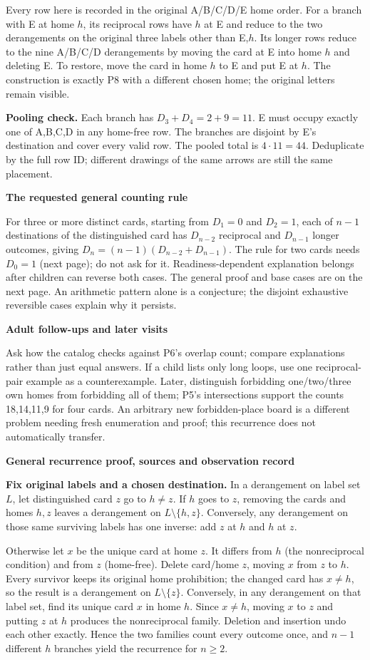 \documentclass[11pt]{article}
\newcommand{\heading}[1]{\par\textbf{\large #1}\par}
\newcommand{\subhead}[1]{\par\textbf{#1}\par}
\newcommand{\guidepage}{\newpage}
\begin{document}
Every row here is recorded in the original A/B/C/D/E home order. For a branch with E at home $h$, its reciprocal rows have $h$ at E and reduce to the two derangements on the original three labels other than E,$h$. Its longer rows reduce to the nine A/B/C/D derangements by moving the card at E into home $h$ and deleting E. To restore, move the card in home $h$ to E and put E at $h$. The construction is exactly P8 with a different chosen home; the original letters remain visible.

\textbf{Pooling check.} Each branch has $D_3+D_4=2+9=11$. E must occupy exactly one of A,B,C,D in any home-free row. The branches are disjoint by E's destination and cover every valid row. The pooled total is $4\cdot11=\boxed{44}$. Deduplicate by the full row ID; different drawings of the same arrows are still the same placement.

\subhead{The requested general counting rule}
For three or more distinct cards, starting from $D_1=0$ and $D_2=1$, each of $n-1$ destinations of the distinguished card has $D_{n-2}$ reciprocal and $D_{n-1}$ longer outcomes, giving $D_n=(n-1)(D_{n-2}+D_{n-1})$. The rule for two cards needs $D_0=1$ (next page); do not ask for it. Readiness-dependent explanation belongs after children can reverse both cases. The general proof and base cases are on the next page. An arithmetic pattern alone is a conjecture; the disjoint exhaustive reversible cases explain why it persists.

\subhead{Adult follow-ups and later visits}
Ask how the catalog checks against P6's overlap count; compare explanations rather than just equal answers. If a child lists only long loops, use one reciprocal-pair example as a counterexample. Later, distinguish forbidding one/two/three own homes from forbidding all of them; P5's intersections support the counts 18,14,11,9 for four cards. An arbitrary new forbidden-place board is a different problem needing fresh enumeration and proof; this recurrence does not automatically transfer.

\guidepage
\heading{General recurrence proof, sources and observation record}

\textbf{Fix original labels and a chosen destination.} In a derangement on label set $L$, let distinguished card $z$ go to $h\ne z$. If $h$ goes to $z$, removing the cards and homes $h,z$ leaves a derangement on $L\setminus\{h,z\}$. Conversely, any derangement on those same surviving labels has one inverse: add $z$ at $h$ and $h$ at $z$.

Otherwise let $x$ be the unique card at home $z$. It differs from $h$ (the nonreciprocal condition) and from $z$ (home-free). Delete card/home $z$, moving $x$ from $z$ to $h$. Every survivor keeps its original home prohibition; the changed card has $x\ne h$, so the result is a derangement on $L\setminus\{z\}$. Conversely, in any derangement on that label set, find its unique card $x$ in home $h$. Since $x\ne h$, moving $x$ to $z$ and putting $z$ at $h$ produces the nonreciprocal family. Deletion and insertion undo each other exactly. Hence the two families count every outcome once, and $n-1$ different $h$ branches yield the recurrence for $n\geq2$.
\end{document}
